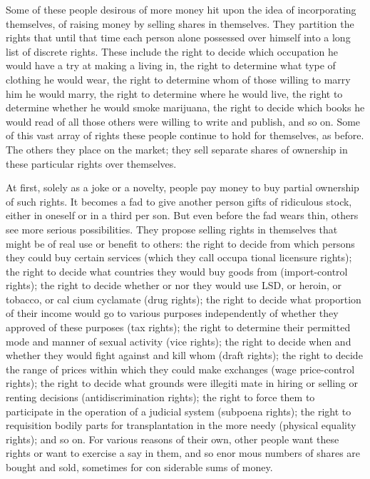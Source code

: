 \documentclass[11pt,openany]{book}
\begin{document}
Some of these people desirous of more money hit upon the idea of incorporating themselves, of raising money by selling shares in themselves. They partition the rights that until that time each person alone possessed over himself into a long list of discrete rights. These include the right to decide which occupation he would have a try at making a living in, the right to determine what type of clothing he would wear, the right to determine whom of those willing to marry him he would marry, the right to determine where he would live, the right to determine whether he would smoke marijuana, the right to decide which books he would read of all those others were willing to write and publish, and so on. Some of this vast array of rights these people continue to hold for themselves, as before. The others they place on the market; they sell separate shares of ownership in these particular rights over themselves. 

At first, solely as a joke or a novelty, people pay money to buy partial ownership of such rights. It becomes a fad to give another person gifts of ridiculous stock, either in oneself or in a third per son. But even before the fad wears thin, others see more serious possibilities. They propose selling rights in themselves that might be of real use or benefit to others: the right to decide from which persons they could buy certain services (which they call occupa tional licensure rights); the right to decide what countries they would buy goods from (import-control rights); the right to decide whether or nor they would use LSD, or heroin, or tobacco, or cal cium cyclamate (drug rights); the right to decide what proportion of their income would go to various purposes independently of whether they approved of these purposes (tax rights); the right to determine their permitted mode and manner of sexual activity (vice rights); the right to decide when and whether they would fight against and kill whom (draft rights); the right to decide the range of prices within which they could make exchanges (wage price-control rights); the right to decide what grounds were illegiti mate in hiring or selling or renting decisions (antidiscrimination rights); the right to force them to participate in the operation of a judicial system (subpoena rights); the right to requisition bodily parts for transplantation in the more needy (physical equality rights); and so on. For various reasons of their own, other people want these rights or want to exercise a say in them, and so enor mous numbers of shares are bought and sold, sometimes for con siderable sums of money. 
\end{document}
